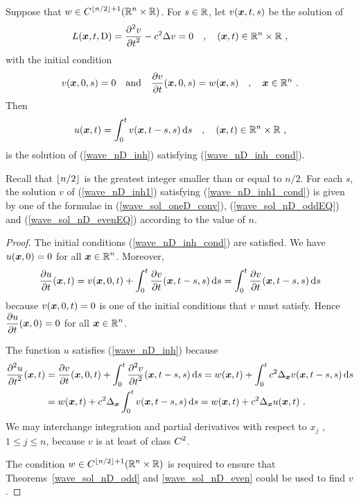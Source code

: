 \begin{theorem}
Suppose that $\displaystyle w\in C^{\lfloor{n/2}\rfloor+1}(\mathbb{R}^n\times \mathbb{R})$.
For $s\in \mathbb{R}$, let $v({\bm{x}},t,s)$ be the solution of
\begin{equation} \label{wave_nD_inh1}
L({\bm{x}},t,\operatorname{D}) = \frac{\displaystyle \partial^{2}{v}} {\displaystyle \partial t^{2}} - c^2 \Delta v = 0 \quad ,
\quad ({\bm{x}},t) \in \mathbb{R}^n \times \mathbb{R} \ ,
\end{equation}
with the initial condition
\begin{equation} \label{wave_nD_inh1_cond}
v({\bm{x}}, 0, s) = 0 \quad \text{and} \quad
\frac{\partial{v}}{\partial t}({\bm{x}},0,s) = w({\bm{x}},s) \quad , \quad
{\bm{x}} \in \mathbb{R}^n \ .
\end{equation}
Then
\[
u({\bm{x}},t) = \int_0^t v({\bm{x}},t-s,s)\,\mathrm{d}{s} \quad , \quad
({\bm{x}},t) \in \mathbb{R}^n \times \mathbb{R} \ ,
\]
is the solution of (\ref{wave_nD_inh}) satisfying
(\ref{wave_nD_inh_cond}).
\end{theorem}

\begin{rmk}
Recall that $\lfloor{n/2}\rfloor$ is the greatest integer smaller than
or equal to $n/2$.  For each $s$, the solution $v$ of (\ref{wave_nD_inh1})
satisfying (\ref{wave_nD_inh1_cond}) is given by one of the formulae
in (\ref{wave_sol_oneD_conv}), (\ref{wave_sol_nD_oddEQ}) and
(\ref{wave_sol_nD_evenEQ}) according to the value of $n$.
\end{rmk}

\begin{proof}
The initial conditions (\ref{wave_nD_inh_cond}) are satisfied.  We
have $u({\bm{x}},0) = 0$ for all $\displaystyle {\bm{x}} \in \mathbb{R}^n$.  Moreover,
\[
\frac{\partial{u}}{\partial t}({\bm{x}},t) = v({\bm{x}}, 0, t) +
\int_0^t \frac{\partial{v}}{\partial t}({\bm{x}}, t-s,s)\,\mathrm{d}{s} =
\int_0^t \frac{\partial{v}}{\partial t}({\bm{x}}, t-s,s)\,\mathrm{d}{s}
\]
because $v({\bm{x}},0,t) = 0$ is one of the initial conditions that $v$
must satisfy.  Hence $\displaystyle \frac{\partial{u}}{\partial t}({\bm{x}},0) = 0$
for all $\displaystyle {\bm{x}} \in \mathbb{R}^n$.

The function $u$ satisfies (\ref{wave_nD_inh}) because
\begin{align*}
\frac{\displaystyle \partial^{2}{u}} {\displaystyle \partial t^{2}}({\bm{x}},t) &= \frac{\partial{v}}{\partial t}({\bm{x}}, 0, t)
+ \int_0^t \frac{\displaystyle \partial^{2}{v}} {\displaystyle \partial t^{2}}({\bm{x}}, t-s, s) \,\mathrm{d}{s}
= w({\bm{x}},t) + \int_0^t c^2 \Delta_{{\bm{x}}} v({\bm{x}},t-s,s) \,\mathrm{d}{s} \\
&= w({\bm{x}},t) + c^2 \Delta_{{\bm{x}}} \int_0^t v({\bm{x}},t-s,s) \,\mathrm{d}{s}
=  w({\bm{x}},t) + c^2 \Delta_{{\bm{x}}} u({\bm{x}},t) \  .
\end{align*}
We may interchange integration and partial derivatives with respect to
$x_j$ , $1\leq j \leq n$, because $v$ is at least of class $\displaystyle C^2$.

The condition $\displaystyle w\in C^{\lfloor{n/2}\rfloor+1}(\mathbb{R}^n\times \mathbb{R})$
is required to ensure that Theorems~\ref{wave_sol_nD_odd}
and \ref{wave_sol_nD_even} could be used to find $v$.
\end{proof}

